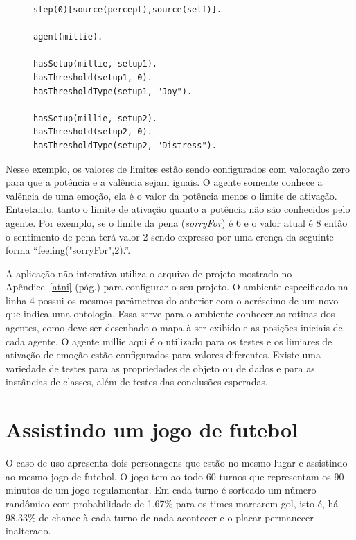 \lstset{linewidth=80mm}
\begin{figure}
	\begin{lstlisting}[frame=trbl,
caption=Parte do código do agente para aplicação interativa de teste,
label=lst:testeJasonIntSetup]
step(0)[source(percept),source(self)].

agent(millie).

hasSetup(millie, setup1).
hasThreshold(setup1, 0).
hasThresholdType(setup1, "Joy").

hasSetup(millie, setup2).
hasThreshold(setup2, 0).
hasThresholdType(setup2, "Distress").
	\end{lstlisting}
\end{figure}

Nesse exemplo, os valores de limites estão sendo configurados com valoração
zero para que a potência e a valência sejam iguais. O agente somente conhece
a valência de uma emoção, ela é o valor da potência menos o limite de
ativação. Entretanto, tanto o limite de ativação quanto a potência não são
conhecidos pelo agente. Por exemplo, se o limite da pena (\emph{sorryFor}) é 6
e o valor atual é 8 então o sentimento de pena terá valor 2 sendo
expresso por uma crença da seguinte forma ``feeling("sorryFor",2).''.


A aplicação não interativa utiliza o arquivo de projeto mostrado no
Apêndice~\ref{atni} (pág.\pageref{atni}) para
configurar o seu projeto. O ambiente especificado na linha 4 possui os mesmos
parâmetros do anterior com o acréscimo de um novo que indica uma ontologia.
Essa serve para o ambiente conhecer as rotinas dos agentes, como
deve ser desenhado o mapa à ser exibido e as posições iniciais de cada
agente. O agente millie aqui é o utilizado para os testes e os limiares de
ativação de emoção estão configurados para valores diferentes. Existe uma
variedade de testes para as propriedades de objeto ou de dados e para as
instâncias de classes, além de testes das conclusões esperadas.

\section{Assistindo um jogo de futebol} \label{ch:cdu:svc}

O caso de uso apresenta dois personagens que estão no mesmo lugar e assistindo ao mesmo jogo de
futebol. O jogo tem ao todo 60 turnos que representam os 90 minutos de um jogo
regulamentar. Em cada turno é sorteado um número randômico com probabilidade
de 1.67\% para os times marcarem gol, isto é, há 98.33\% de
chance à cada turno de nada acontecer e o placar permanecer inalterado.

